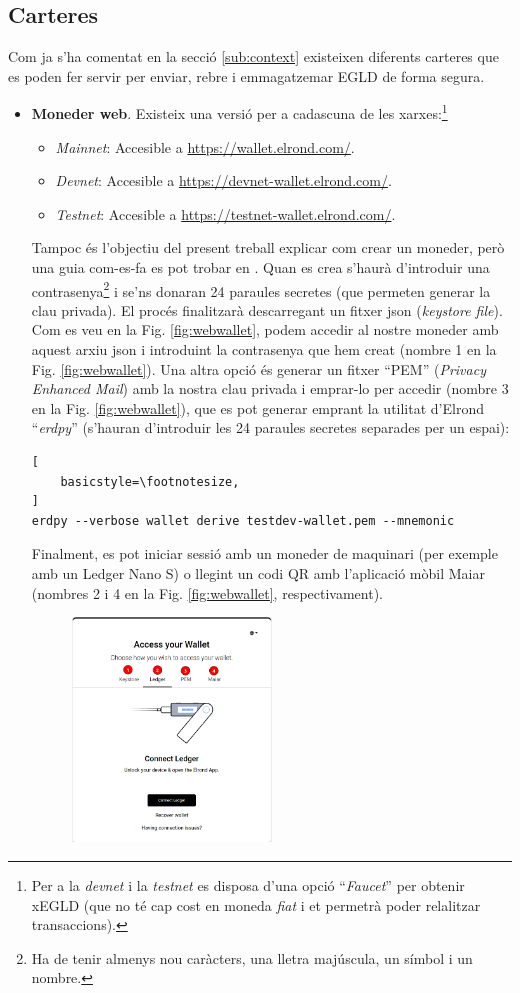 \documentclass[11pt,a4paper]{article}
\makeatletter
\renewcommand\footnotesize{%
   \@setfontsize\footnotesize\@ixpt{9}%
   \abovedisplayskip 8\p@ \@plus2\p@ \@minus4\p@
   \abovedisplayshortskip \z@ \@plus\p@
   \belowdisplayshortskip 4\p@ \@plus2\p@ \@minus2\p@
   \def\@listi{\leftmargin\leftmargini
               \topsep 4\p@ \@plus2\p@ \@minus2\p@
               \parsep 2\p@ \@plus\p@ \@minus\p@
               \itemsep \parsep}%
   \belowdisplayskip \abovedisplayskip
}
\makeatother
\begin{document}
\subsection{Carteres}
Com ja s'ha comentat en la secció \ref{sub:context} existeixen diferents carteres que es poden fer servir per enviar, rebre i emmagatzemar EGLD de forma segura.
\begin{itemize}
\item \textbf{Moneder web}. Existeix una versió per a cadascuna de les xarxes:\footnote{Per a la \textit{devnet} i la \textit{testnet} es disposa d'una opció ``\textit{Faucet}'' per obtenir xEGLD (que no té cap cost en moneda \textit{fiat} i et permetrà poder relalitzar transaccions).}
	\begin{itemize}
	\item \textit{Mainnet}: Accesible a \url{https://wallet.elrond.com/}.
	\item \textit{Devnet}: Accesible a \url{https://devnet-wallet.elrond.com/}.
	\item \textit{Testnet}: Accesible a \url{https://testnet-wallet.elrond.com/}.
	\end{itemize}
Tampoc és l'objectiu del present treball explicar com crear un moneder, però una guia com-es-fa es pot trobar en \cite{elrond2022}. Quan es crea s'haurà d'introduir una contrasenya\footnote{Ha de tenir almenys nou caràcters, una lletra majúscula, un símbol i un nombre.} i se'ns donaran 24 paraules secretes (que permeten generar la clau privada). El procés finalitzarà descarregant un fitxer json (\textit{keystore file}). Com es veu en la Fig. \ref{fig:webwallet}, podem accedir al nostre moneder amb aquest arxiu json i introduint la contrasenya que hem creat (nombre 1 en la Fig. \ref{fig:webwallet}). Una altra opció és generar un fitxer ``PEM'' (\textit{Privacy Enhanced Mail}) amb la nostra clau privada i emprar-lo per accedir (nombre 3 en la Fig. \ref{fig:webwallet}), que es pot generar emprant la utilitat d'Elrond ``\textit{erdpy}'' (s'hauran d'introduir les 24 paraules secretes separades per un espai):
\begin{lstlisting}[
    basicstyle=\footnotesize,
]
erdpy --verbose wallet derive testdev-wallet.pem --mnemonic
\end{lstlisting}
Finalment, es pot iniciar sessió amb un moneder de maquinari (per exemple amb un Ledger Nano S) o llegint un codi QR amb l'aplicació mòbil Maiar (nombres 2 i 4 en la Fig. \ref{fig:webwallet}, respectivament).
\begin{figure}[h]
\includegraphics[width=0.5\textwidth]{webwallet.png}

\end{figure}
\end{itemize}
\end{document}
